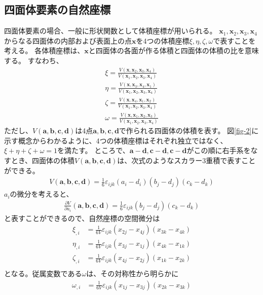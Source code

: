 \documentclass{jarticle}
\begin{document}
\subsection{四面体要素の自然座標}
四面体要素の場合、一般に形状関数として体積座標が用いられる。
$\bm{x}_1, \bm{x}_2, \bm{x}_3, \bm{x}_4$からなる四面体の内部および表面上の点$\bm{x}$を4つの体積座標$\xi, \eta, \zeta,\omega$で表すことを考える。
各体積座標は、$\bm{x}$と四面体の各面が作る体積と四面体の体積の比を意味する。
すなわち、
\begin{align}
  \xi = \frac{V(\bm{x}, \bm{x}_2, \bm{x}_3, \bm{x}_4)}{V(\bm{x}_1, \bm{x}_2, \bm{x}_3, \bm{x}_4)}\\
  \eta = \frac{V(\bm{x}, \bm{x}_3, \bm{x}_4, \bm{x}_1)}{V(\bm{x}_1, \bm{x}_2, \bm{x}_3, \bm{x}_4)}\\
  \zeta = \frac{V(\bm{x}, \bm{x}_4, \bm{x}_1, \bm{x}_2)}{V(\bm{x}_1, \bm{x}_2, \bm{x}_3, \bm{x}_4)}\\
  \omega = \frac{V(\bm{x}, \bm{x}_1, \bm{x}_2, \bm{x}_3)}{V(\bm{x}_1, \bm{x}_2, \bm{x}_3, \bm{x}_4)}
\end{align}
ただし、$V(\bm{a}, \bm{b}, \bm{c}, \bm{d})$は4点$\bm{a},\bm{b},\bm{c},\bm{d}$で作られる四面体の体積を表す。
図\ref{fig-2}に示す概念からわかるように、4つの体積座標はそれぞれ独立ではなく、$\xi+\eta+\zeta+\omega=1$を満たす。
ところで、$\bm{a}-\bm{d},\bm{c}-\bm{d},\bm{c}-\bm{d}$がこの順に右手系をなすとき、四面体の体積$V(\bm{a}, \bm{b}, \bm{c}, \bm{d})$は、次式のようなスカラー3重積で表すことができる。
\begin{align}
  V(\bm{a}, \bm{b}, \bm{c}, \bm{d}) = \frac{1}{6}\varepsilon_{ijk}(a_i - d_i)(b_j-d_j)(c_k - d_k)
\end{align}
$a_i$の微分を考えると、
\begin{align}
  \frac{\partial V}{\partial a_i}(\bm{a}, \bm{b}, \bm{c}, \bm{d}) = \frac{1}{6}\varepsilon_{ijk}(b_j-d_j)(c_k - d_k)  
\end{align}
と表すことができるので、自然座標の空間微分は
\begin{align}
  \xi_{,i} &= \frac{1}{6V}\varepsilon_{ijk}(x_{2j} - x_{4j})(x_{3k} - x_{4k})\\
  \eta_{,i} &= \frac{1}{6V}\varepsilon_{ijk}(x_{3j} - x_{1j})(x_{4k} - x_{1k})\\
  \zeta_{,i} &= \frac{1}{6V}\varepsilon_{ijk}(x_{4j} - x_{2j})(x_{1k} - x_{2k})\\
\end{align}
となる。従属変数である$\omega$は、その対称性から明らかに
\begin{align}
  \omega_{,i} &= \frac{1}{6V}\varepsilon_{ijk}(x_{1j} - x_{3j})(x_{2k} - x_{3k})
\end{align}
\end{document}
